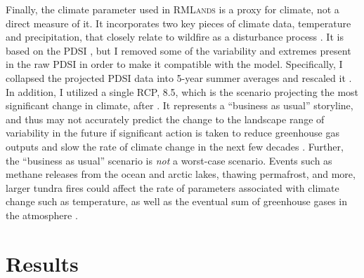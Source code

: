 Finally, the climate parameter used in \textsc{RMLands} is a proxy for climate, not a direct measure of it. It incorporates two key pieces of climate data, temperature and precipitation, that closely relate to wildfire as a disturbance process \citep{Cushman2011}. It is based on the PDSI \citep{HeimJr2002}, but I removed some of the variability and extremes present in the raw PDSI in order to make it compatible with the model. Specifically, I collapsed the projected PDSI data into 5-year summer averages and rescaled it \citep{Cushman2011}. In addition, I utilized a single RCP, 8.5, which is the scenario projecting the most significant change in climate, after \citet{Cook2014}. It represents a ``business as usual'' storyline, and thus may not accurately predict the change to the landscape range of variability in the future if significant action is taken to reduce greenhouse gas outputs and slow the rate of climate change in the next few decades \citep{Riahi2011}. Further, the ``business as usual'' scenario is \emph{not} a worst-case scenario. Events such as methane releases from the ocean and arctic lakes, thawing permafrost, and more, larger tundra fires could affect the rate of parameters associated with climate change such as temperature, as well as the eventual sum of greenhouse gases in the atmosphere \citep{Shakova2010,Schuur2009,Higuera2008,Racine2004,Hu2015}.






\section{Results}


